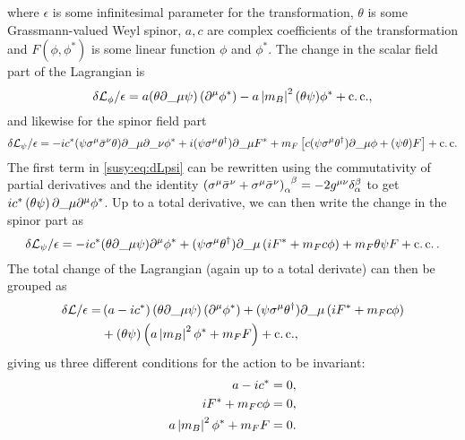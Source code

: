 \documentclass[../main.tex]{subfiles}
\begin{document}
where \(\epsilon\) is some infinitesimal parameter for the transformation, \(\theta\) is some Grassmann-valued Weyl spinor, \(a, c\) are complex coefficients of the transformation and \(F(\phi, \phi^\ast)\) is some linear function \(\phi\) and \(\phi^\ast\).
The change in the scalar field part of the Lagrangian is
\begin{equation}
    \label{susy:eq:dLphi}
    \delta\L_\phi / \epsilon = a (\theta\partial\_{\mu}\psi) \pclosed{\partial\^{\mu} \phi^\ast} - a\abs{m_B}^2 (\theta\psi) \phi^\ast + \cc,
\end{equation}
and likewise for the spinor field part
\begin{equation}
    \label{susy:eq:dLpsi}
    \delta\L_\psi/\epsilon = -i c^\ast (\psi \sigma\^{\mu}\bar{\sigma}\^{\nu}\theta) \partial\_{\mu}\partial\_{\nu} \phi^\ast + i (\psi \sigma\^{\mu} \theta^\dagger) \partial\_{\mu} F^\ast + m_F \bclosed{c (\psi\sigma\^{\mu}\theta^\dagger) \partial\_{\mu} \phi + (\psi\theta) F} + \cc
\end{equation}
The first term in \cref{susy:eq:dLpsi} can be rewritten using the commutativity of partial derivatives and the identity \(\tensor{\pclosed{\sigma\^{\mu} \bar{\sigma}\^{\nu} + \sigma\^{\mu} \bar{\sigma}\^{\nu}}}{_\alpha^\beta} = -2\tensor{g}{^\mu^\nu} \tensor*{\delta}{_\alpha^\beta}\) to get \(i c^\ast \pclosed{\theta \psi} \partial\_{\mu}\partial\^{\mu} \phi^\ast\).
Up to a total derivative, we can then write the change in the spinor part as
\begin{equation}
    \delta\L_\psi/\epsilon = -i c^\ast (\theta\partial\_{\mu}\psi)\partial\^{\mu} \phi^\ast + (\psi \sigma\^{\mu} \theta^\dagger) \partial\_{\mu} \pclosed{i F^\ast + m_F c \phi} + m_F \theta\psi F + \cc.
\end{equation}
The total change of the Lagrangian (again up to a total derivate) can then be grouped as
\begin{align}
    \nonumber
    \delta\L/\epsilon = & \pclosed{a-ic^\ast} (\theta\partial\_{\mu}\psi) \pclosed{\partial\^{\mu} \phi^\ast}
    + (\psi \sigma\^{\mu} \theta^\dagger) \partial\_{\mu} \pclosed{i F^\ast + m_F c \phi}                     \\
                        & + (\theta\psi) \pclosed{a\abs{m_B}^2\phi^\ast + m_F F} + \cc,
\end{align}
giving us three different conditions for the action to be invariant:
\begin{subequations}
    \begin{align}
        a - ic^\ast                    & = 0, \\
        i F^\ast + m_F c \phi          & = 0, \\
        a\left|m_B\right|^2 \phi^\ast + m_F F & = 0.
    \end{align}
\end{subequations}
\end{document}
